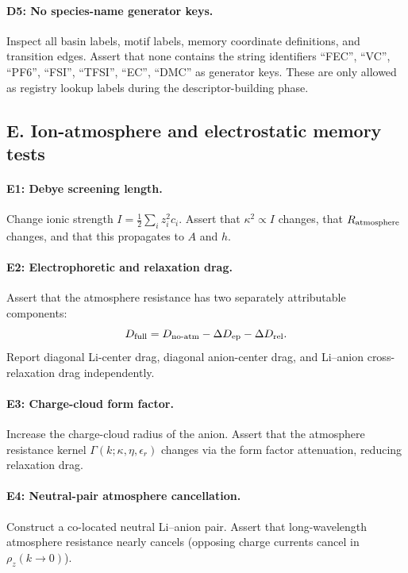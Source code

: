 \documentclass[11pt]{article}
\begin{document}
\paragraph{D5: No species-name generator keys.}
Inspect all basin labels, motif labels, memory coordinate definitions, and
transition edges. Assert that none contains the string identifiers
``FEC'', ``VC'', ``PF6'', ``FSI'', ``TFSI'', ``EC'', ``DMC'' as
generator keys. These are only allowed as registry lookup labels during
the descriptor-building phase.

\subsection{E. Ion-atmosphere and electrostatic memory tests}

\paragraph{E1: Debye screening length.}
Change ionic strength \(I=\tfrac{1}{2}\sum_i z_i^2 c_i\). Assert that
\(\kappa^2 \propto I\) changes, that \(R_{\rm atmosphere}\) changes,
and that this propagates to \(A\) and \(h\).

\paragraph{E2: Electrophoretic and relaxation drag.}
Assert that the atmosphere resistance has two separately attributable
components:
\[
D_{\rm full} = D_{\rm no\text{-}atm} - \Delta D_{\rm ep} - \Delta D_{\rm rel}.
\]
Report diagonal Li-center drag, diagonal anion-center drag, and
Li--anion cross-relaxation drag independently.

\paragraph{E3: Charge-cloud form factor.}
Increase the charge-cloud radius of the anion. Assert that the atmosphere
resistance kernel \(\Gamma(k;\kappa,\eta,\epsilon_r)\) changes via the
form factor attenuation, reducing relaxation drag.

\paragraph{E4: Neutral-pair atmosphere cancellation.}
Construct a co-located neutral Li--anion pair. Assert that long-wavelength
atmosphere resistance nearly cancels (opposing charge currents cancel in
\(\rho_z(k\to0)\)).
\end{document}
